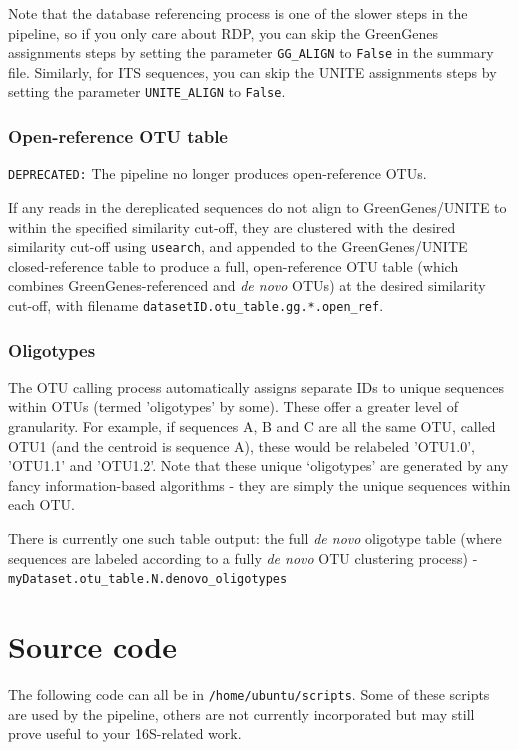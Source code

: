 \documentclass[11pt, oneside]{article}   	%
\begin{document}
Note that the database referencing process is one of the slower steps in the pipeline, so if you only care about RDP, you can skip the GreenGenes assignments steps by setting the parameter {\tt GG\_ALIGN} to {\tt False} in the summary file.  Similarly, for ITS sequences, you can skip the UNITE assignments steps by setting the parameter {\tt UNITE\_ALIGN} to {\tt False}.

\subsubsection{Open-reference OTU table}
{\tt DEPRECATED:} The pipeline no longer produces open-reference OTUs. 

If any reads in the dereplicated sequences do not align to GreenGenes/UNITE to within the specified similarity cut-off, they are clustered with the desired similarity cut-off using {\tt usearch}, and appended to the GreenGenes/UNITE closed-reference table to produce a full, open-reference OTU table (which combines GreenGenes-referenced and \textit{de novo} OTUs) at the desired similarity cut-off, with filename {\tt datasetID.otu\_table.gg.*.open\_ref}.

\subsubsection{Oligotypes}
The OTU calling process automatically assigns separate IDs to unique sequences within OTUs (termed 'oligotypes' by some).  These offer a greater level of granularity.  For example, if sequences A, B and C are all the same OTU, called OTU1 (and the centroid is sequence A), these would be relabeled 'OTU1.0', 'OTU1.1' and 'OTU1.2'. Note that
these unique `oligotypes' are generated by any fancy information-based algorithms -
they are simply the unique sequences within each OTU.

There is currently one such table output: the full \textit{de novo} oligotype table (where sequences are labeled according to a fully \textit{de novo} OTU clustering process) - \\{\tt myDataset.otu\_table.N.denovo\_oligotypes}

\section{Source code}
The following code can all be in \texttt{/home/ubuntu/scripts}. Some of these scripts
are used by the pipeline, others are not currently incorporated but may still prove
useful to your 16S-related work.
\end{document}
